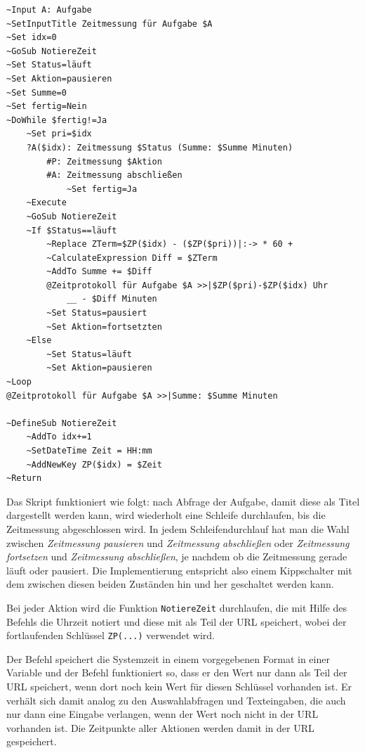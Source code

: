 \label{BspZeitmesser}
\begin{verbatim}
~Input A: Aufgabe
~SetInputTitle Zeitmessung für Aufgabe $A
~Set idx=0
~GoSub NotiereZeit
~Set Status=läuft
~Set Aktion=pausieren
~Set Summe=0
~Set fertig=Nein
~DoWhile $fertig!=Ja
    ~Set pri=$idx
    ?A($idx): Zeitmessung $Status (Summe: $Summe Minuten)
        #P: Zeitmessung $Aktion    
        #A: Zeitmessung abschließen    
            ~Set fertig=Ja
    ~Execute
    ~GoSub NotiereZeit    
    ~If $Status==läuft
        ~Replace ZTerm=$ZP($idx) - ($ZP($pri))|:-> * 60 +
        ~CalculateExpression Diff = $ZTerm
        ~AddTo Summe += $Diff
        @Zeitprotokoll für Aufgabe $A >>|$ZP($pri)-$ZP($idx) Uhr
            __ - $Diff Minuten
        ~Set Status=pausiert
        ~Set Aktion=fortsetzten        
    ~Else
        ~Set Status=läuft
        ~Set Aktion=pausieren
~Loop
@Zeitprotokoll für Aufgabe $A >>|Summe: $Summe Minuten

~DefineSub NotiereZeit
    ~AddTo idx+=1
    ~SetDateTime Zeit = HH:mm
    ~AddNewKey ZP($idx) = $Zeit
~Return
\end{verbatim}

Das Skript funktioniert wie folgt: nach Abfrage der Aufgabe, damit diese als Titel dargestellt werden kann, wird wiederholt eine Schleife durchlaufen, bis die Zeitmessung abgeschlossen wird. In jedem Schleifendurchlauf hat man die Wahl zwischen \emph{Zeitmessung pausieren} und \emph{Zeitmessung abschließen} oder \emph{Zeitmessung fortsetzen} und \emph{Zeitmessung abschließen}, je nachdem ob die Zeitmessung gerade läuft oder pausiert. Die Implementierung entspricht also einem Kippschalter mit dem zwischen diesen beiden Zuständen hin und her geschaltet werden kann.

Bei jeder Aktion wird die Funktion \verb|NotiereZeit| durchlaufen, die mit Hilfe des Befehls  die Uhrzeit notiert und diese mit  als Teil der URL speichert, wobei der fortlaufenden Schlüssel \verb|ZP(...)| verwendet wird.

Der Befehl  speichert die Systemzeit in einem vorgegebenen Format in einer Variable und der Befehl  funktioniert so, dass er den Wert nur dann als Teil der URL speichert, wenn dort noch kein Wert für diesen Schlüssel vorhanden ist. Er verhält sich damit analog zu den Auswahlabfragen und Texteingaben, die auch nur dann eine Eingabe verlangen, wenn der Wert noch nicht in der URL vorhanden ist. Die Zeitpunkte aller Aktionen werden damit in der URL gespeichert.

